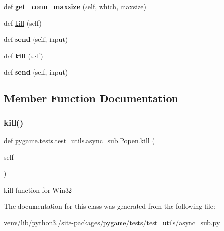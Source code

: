 \begin{DoxyCompactItemize}
def {\bfseries get\+\_\+conn\+\_\+maxsize} (self, which, maxsize)
\item 
def \hyperlink{classpygame_1_1tests_1_1test__utils_1_1async__sub_1_1_popen_ae559894f3fb49554c8d42b36889a54f8}{kill} (self)
\item 
\mbox{\label{classpygame_1_1tests_1_1test__utils_1_1async__sub_1_1_popen_a675c7d2a6b7d2566fc1e4582119b2511}} 
def {\bfseries send} (self, input)
\item 
\mbox{\label{classpygame_1_1tests_1_1test__utils_1_1async__sub_1_1_popen_ae559894f3fb49554c8d42b36889a54f8}} 
def {\bfseries kill} (self)
\item 
\mbox{\label{classpygame_1_1tests_1_1test__utils_1_1async__sub_1_1_popen_a675c7d2a6b7d2566fc1e4582119b2511}} 
def {\bfseries send} (self, input)
\end{DoxyCompactItemize}


\subsection{Member Function Documentation}
\mbox{\label{classpygame_1_1tests_1_1test__utils_1_1async__sub_1_1_popen_ae559894f3fb49554c8d42b36889a54f8}} 
\subsubsection{\texorpdfstring{kill()}{kill()}}
{\footnotesize\ttfamily def pygame.\+tests.\+test\+\_\+utils.\+async\+\_\+sub.\+Popen.\+kill (\begin{DoxyParamCaption}\item[{}]{self }\end{DoxyParamCaption})}

\begin{DoxyVerb}kill function for Win32\end{DoxyVerb}
 

The documentation for this class was generated from the following file\+:\begin{DoxyCompactItemize}
\item 
venv/lib/python3./site-\/packages/pygame/tests/test\+\_\+utils/async\+\_\+sub.\+py\end{DoxyCompactItemize}
